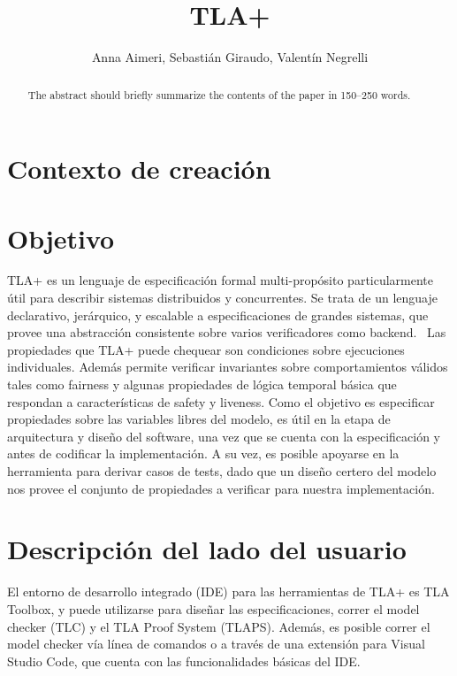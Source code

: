 \documentclass[runningheads]{llncs}
\begin{document}
\title{TLA+}
\author{Anna Aimeri, Sebastián Giraudo, Valentín Negrelli}
\maketitle              %
%
\begin{abstract}
The abstract should briefly summarize the contents of the paper in
150--250 words.

\end{abstract}

\section{Contexto de creación}

\section{Objetivo}
TLA+ es un lenguaje de especificación formal multi-propósito particularmente útil para describir sistemas distribuidos y concurrentes. Se trata de un lenguaje declarativo, jerárquico, y escalable a especificaciones de grandes sistemas, que provee una abstracción consistente sobre varios verificadores como backend. 
Las propiedades que TLA+ puede chequear son condiciones sobre ejecuciones individuales. Además permite verificar invariantes sobre comportamientos válidos tales como fairness y algunas propiedades de lógica temporal básica que respondan a características de safety y liveness.
Como el objetivo es especificar propiedades sobre las variables libres del modelo, es útil en la etapa de arquitectura y diseño del software, una vez que se cuenta con la especificación y antes de codificar la implementación. A su vez, es posible apoyarse en la herramienta para derivar casos de tests, dado que un diseño certero del modelo nos provee el conjunto de propiedades a verificar para nuestra implementación.

\section{Descripción del lado del usuario}
El entorno de desarrollo integrado (IDE) para las herramientas de TLA+ es TLA Toolbox, y puede utilizarse para diseñar las especificaciones, correr el model checker (TLC) y el TLA Proof System (TLAPS). Además, es posible correr el model checker vía línea de comandos o a través de una extensión para Visual Studio Code, que cuenta con las funcionalidades básicas del IDE.
\end{document}
